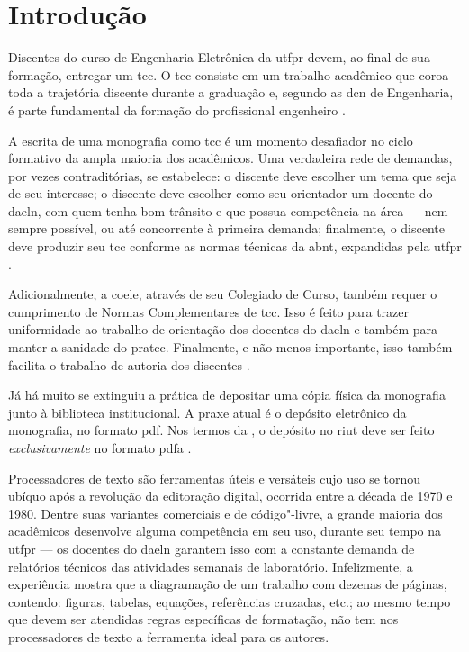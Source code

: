 \chapter{Introdução}

Discentes do curso de Engenharia Eletrônica da \ac{utfpr} devem, ao final de sua formação, entregar um \ac{tcc}. O \ac{tcc} consiste em um trabalho acadêmico que coroa toda a trajetória discente durante a graduação e, segundo as \ac{dcn} de Engenharia, é parte fundamental da formação do profissional engenheiro \cite{mec2021}.

A escrita de uma monografia como \ac{tcc} é um momento desafiador no ciclo formativo da ampla maioria dos acadêmicos. Uma verdadeira rede de demandas, por vezes contraditórias, se estabelece: o discente deve escolher um tema que seja de seu interesse; o discente deve escolher como seu orientador um docente do \ac{daeln}, com quem tenha bom trânsito e que possua competência na área --- nem sempre possível, ou até concorrente à primeira demanda; finalmente, o discente deve produzir seu \ac{tcc} conforme as normas técnicas da \ac{abnt}, expandidas pela \ac{utfpr} \cites{cogep2021,prograd2021}.

Adicionalmente, a \ac{coele}, através de seu Colegiado de Curso, também requer o cumprimento de Normas Complementares de \ac{tcc}. Isso é feito para trazer uniformidade ao trabalho de orientação dos docentes do \ac{daeln} e também para manter a sanidade do \ac{pratcc}. Finalmente, e não menos importante, isso também facilita o trabalho de autoria dos discentes \cite{coele2023}.

Já há muito se extinguiu a prática de depositar uma cópia física da monografia junto à biblioteca institucional. A praxe atual é o depósito eletrônico da monografia, no formato \ac{pdf}. Nos termos da , o depósito no \ac{riut} deve ser feito \emph{exclusivamente} no formato \ac{pdfa} \cite{prograd2021}.

Processadores de texto são ferramentas úteis e versáteis cujo uso se tornou ubíquo após a revolução da editoração digital, ocorrida entre a década de 1970 e 1980. Dentre suas variantes comerciais e de código"-livre, a grande maioria dos acadêmicos desenvolve alguma competência em seu uso, durante seu tempo na \ac{utfpr} --- os docentes do \ac{daeln} garantem isso com a constante demanda de relatórios técnicos das atividades semanais de laboratório. Infelizmente, a experiência mostra que a diagramação de um trabalho com dezenas de páginas, contendo: figuras, tabelas, equações, referências cruzadas, etc.; ao mesmo tempo que devem ser atendidas regras específicas de formatação, não tem nos processadores de texto a ferramenta ideal para os autores.

